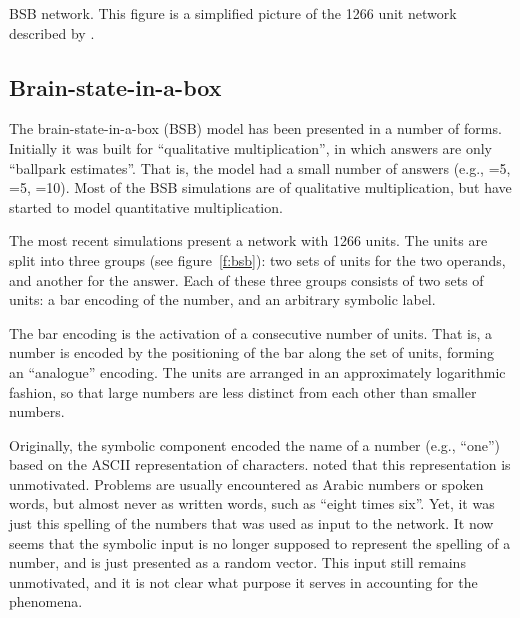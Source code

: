 
\begin{fancyfigure}
\centerline{}
\caption{BSB network.  This figure is a simplified picture
of the 1266 unit network described by
\protect{}.}\label{f:bsb}
\end{fancyfigure}

\subsection{Brain-state-in-a-box}\label{s:bsb}

The brain-state-in-a-box (BSB) model
\cite{andestud,viscrepr,viscmemo,andeexpe} has been presented in a number
of forms.  Initially it was built for ``qualitative multiplication'', in
which answers are only ``ballpark estimates''.  That is, the model had a
small number of answers (e.g., =5, =5, =10).
Most of the BSB simulations are of qualitative
multiplication, but  have started to model quantitative
multiplication.

The most recent simulations present a network with 1266
units.  The units are split into three groups (see figure~\ref{f:bsb}): two
sets of units for the two operands, and another for the answer. Each of
these three groups consists of two sets of units: a bar encoding of the
number, and an arbitrary symbolic label.

The bar encoding is the activation of a consecutive number of units.
That is, a number is encoded by
the positioning of the bar along the set of units,
forming an ``analogue'' encoding. The units are
arranged in an approximately logarithmic fashion, so that large numbers are
less distinct from each other than smaller numbers.

Originally, the symbolic component encoded the name of a number (e.g.,
``one'') based on the ASCII representation of characters.
 noted that this representation is unmotivated.  Problems
are usually encountered as Arabic numbers or spoken words, but almost never
as written words, such as ``eight times six''.  Yet, it was just this
spelling of the numbers that was used as input to the network.  It now
seems that the symbolic input is no longer supposed to represent the
spelling of a number, and is just presented as a random vector.  This input
still remains unmotivated, and it is not clear what purpose it serves in
accounting for the phenomena.

